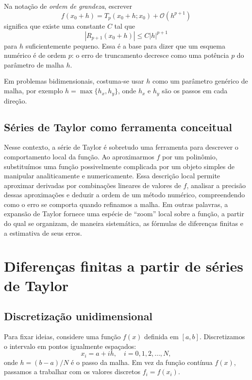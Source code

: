 Na notação de \emph{ordem de grandeza}, escrever
\begin{equation}
    f(x_0 + h) = T_p(x_0 + h; x_0) + \mathcal{O}(h^{p+1})
\end{equation}
significa que existe uma constante $C$ tal que
\begin{equation}
    |R_{p+1}(x_0 + h)| \le C |h|^{p+1}
\end{equation}
para $h$ suficientemente pequeno. Essa é a base para dizer que 
um esquema numérico é de ordem $p$: o erro de truncamento decresce como 
uma potência $p$ do parâmetro de malha $h$.

Em problemas bidimensionais, costuma-se usar $h$ como um parâmetro genérico 
de malha, por exemplo $h = \max\{h_x,h_y\}$, onde $h_x$ e $h_y$ são os passos 
em cada direção.

\subsection{Séries de Taylor como ferramenta conceitual}

Nesse contexto, a série de Taylor é sobretudo uma ferramenta para descrever 
o comportamento local da função. Ao aproximarmos $f$ por um polinômio, 
substituímos uma função possivelmente complicada por um objeto simples de 
manipular analiticamente e numericamente. Essa descrição local permite 
aproximar derivadas por combinações lineares de valores de $f$, analisar a 
precisão dessas aproximações e deduzir a ordem de um método numérico, 
compreendendo como o erro se comporta quando refinamos a malha. Em outras 
palavras, a expansão de Taylor fornece uma espécie de ``zoom'' local sobre 
a função, a partir do qual se organizam, de maneira sistemática, as fórmulas 
de diferenças finitas e a estimativa de seus erros.

\section{Diferenças finitas a partir de séries de Taylor}

\subsection{Discretização unidimensional}

Para fixar ideias, considere uma função $f(x)$ definida em $[a,b]$. 
Discretizamos o intervalo em pontos igualmente espaçados:
\begin{equation}
    x_i = a + i h, \quad i = 0,1,2,\dots,N,
\end{equation}
onde $h = (b-a)/N$ é o passo da malha. Em vez da função contínua $f(x)$, 
passamos a trabalhar com os valores discretos $f_i = f(x_i)$.

